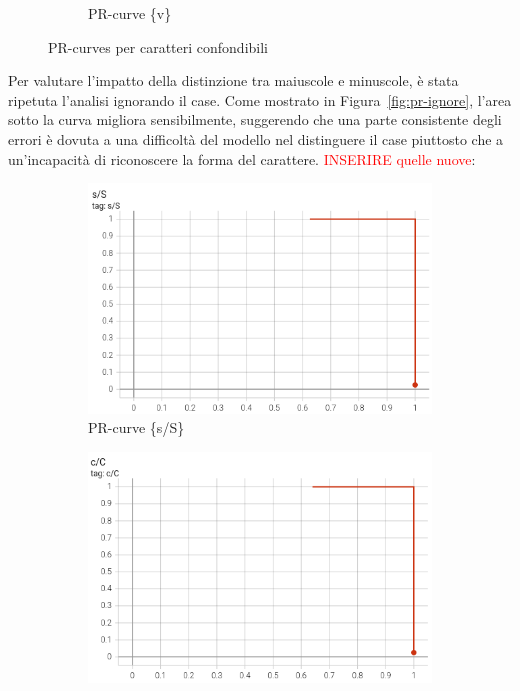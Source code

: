 \begin{figure}[htbp]
\begin{subfigure}[t]{0.32\textwidth}
        \caption{PR-curve \{v\}}
    \end{subfigure}
    \caption{PR-curves per caratteri confondibili}
    \label{fig:pr-confondibili}
\end{figure}

Per valutare l'impatto della distinzione tra maiuscole e minuscole, è stata ripetuta l'analisi ignorando il case. Come mostrato in Figura~\ref{fig:pr-ignore}, l'area sotto la curva migliora sensibilmente, suggerendo che una parte consistente degli errori è dovuta a una difficoltà del modello nel distinguere il case piuttosto che a un'incapacità di riconoscere la forma del carattere.
\textcolor{red}{INSERIRE quelle nuove}:
\begin{figure}[htbp]
    \centering
    \begin{subfigure}[t]{0.32\textwidth}
        \centering
        \includegraphics[width=\textwidth]{images/pr_ignore1.png}
        \caption{PR-curve \{s/S\}}
    \end{subfigure}
    \begin{subfigure}[t]{0.32\textwidth}
        \centering
        \includegraphics[width=\textwidth]{images/pr_ignore2.png}

\end{subfigure}
\end{figure}

